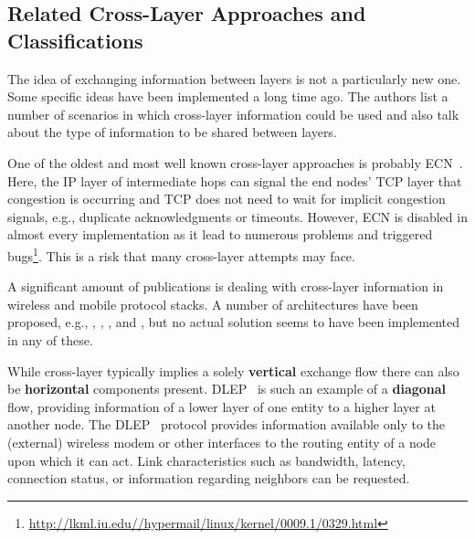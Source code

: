 

\subsection{Related Cross-Layer Approaches and Classifications}

The idea of exchanging information between layers is not a particularly new one. Some specific ideas have been implemented a long time ago. The authors \cite{Raisinghani2004720} list a number of scenarios in which cross-layer information could be used and also talk about the type of information to be shared between layers.

One of the oldest and most well known cross-layer approaches is probably \gls{ECN}~\cite{rfc3168}. Here, the \gls{IP} layer of intermediate hops can signal the end nodes' \gls{TCP} layer that congestion is occurring and \gls{TCP} does not need to wait for implicit congestion signals, e.g., duplicate acknowledgments or timeouts. However, \gls{ECN} is disabled in almost every implementation as it lead to numerous problems and triggered bugs\footnote{\url{http://lkml.iu.edu//hypermail/linux/kernel/0009.1/0329.html}}. This is a risk that many cross-layer attempts may face.

A significant amount of publications is dealing with cross-layer information in wireless and mobile protocol stacks. A number of architectures have been proposed, e.g., \cite{raisinghani2004eclair, 1580937}, \cite{wang2003multi}, \cite{1200522}, and \cite{krishna2007cross}, but no actual solution seems to have been implemented in any of these.

While cross-layer typically implies a solely \textbf{vertical} exchange flow there can also be \textbf{horizontal} components present. \gls{DLEP}~\cite{ietf2013dlepdraft} is such an example of a \textbf{diagonal} flow, providing information of a lower layer of one entity to a higher layer at another node.
The \gls{DLEP}~\cite{ietf2013dlepdraft,6379143} protocol provides information available only to the (external) wireless modem or other interfaces to the routing entity of a node upon which it can act. Link characteristics such as bandwidth, latency, connection status, or information regarding neighbors can be requested.

